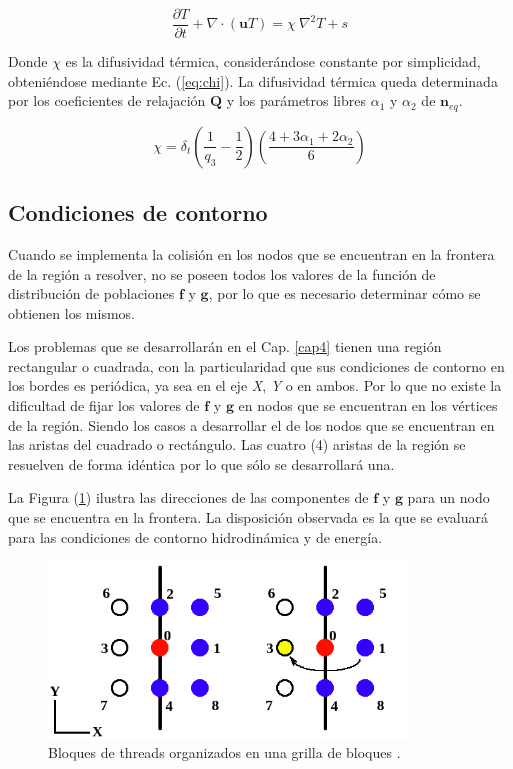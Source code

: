 \begin{equation}
    \frac{\partial T}{\partial t} + \nabla \cdot ( \mathbf{u} T ) = \chi \> {\nabla }^{2} T + s
\end{equation}

Donde $\chi$ es la difusividad térmica, considerándose constante por simplicidad, obteniéndose mediante Ec. (\ref{eq:chi}). La difusividad térmica queda determinada por los coeficientes de relajación $\mathbf{Q}$ y los parámetros libres $\alpha_{1}$ y $\alpha_{2}$ de ${\textbf{n}}_{eq}$.

\begin{equation}
    \chi = \delta_{t} \left( \frac{1}{q_{3}} - \frac{1}{2} \right) \left( \frac{ 4 + 3 \alpha_{1} + 2 \alpha_{2}}{6} \right)
    \label{eq:chi}
\end{equation}

\subsection{Condiciones de contorno}

Cuando se implementa la colisión en los nodos que se encuentran en la frontera de la región a resolver, no se poseen todos los valores de la función de distribución de poblaciones $\mathbf{f}$ y $\mathbf{g}$, por lo que es necesario determinar cómo se obtienen los mismos. 

Los problemas que se desarrollarán en el Cap. \ref{cap4} tienen una región rectangular o cuadrada, con la particularidad que sus  condiciones de contorno en los bordes es periódica, ya sea en el eje \textit{X}, \textit{Y} o en ambos. Por lo que no existe la dificultad de fijar los valores de $\mathbf{f}$ y $\mathbf{g}$ en nodos que se encuentran en los vértices de la región. Siendo los casos a desarrollar  el de los nodos que se encuentran en las aristas del cuadrado o rectángulo. Las cuatro (4) aristas de la región se resuelven de forma idéntica por lo que sólo se  desarrollará una.

La Figura (\ref{fig:CC_hidro}) ilustra las direcciones de las componentes de $\mathbf{f}$ y $\mathbf{g}$ para un nodo que se encuentra en la frontera. La disposición observada es la que se evaluará para las condiciones de contorno hidrodinámica y de energía.  

\begin{figure}[h!]
	\centering
	\includegraphics[width=0.85\textwidth]{figs/cap2/CC_hidrodinamica.png}
	\caption{Bloques de threads organizados en una grilla de bloques \cite{rinaldi2011modelos}.}
	\label{fig:CC_hidro}
\end{figure}

